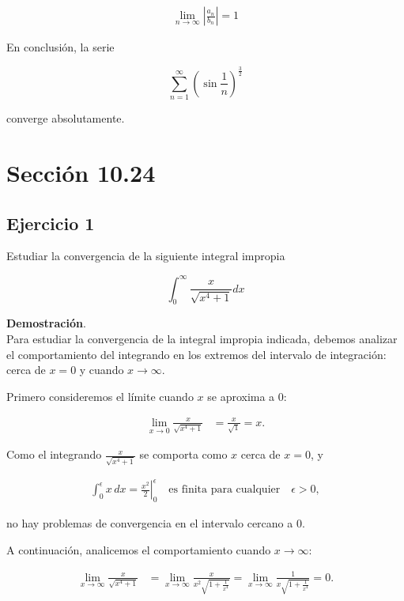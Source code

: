\documentclass{article}
\begin{document}
    \begin{align*}
    \lim _{n \rightarrow \infty}\left|\frac{a_n}{b_n}\right| = 1
    \end{align*}

    En conclusión, la serie

    $$
    \sum_{n=1}^{\infty}\left(\sin \frac{1}{n}\right)^{\frac{3}{2}}
    $$

    converge absolutamente.
    \section*{Sección 10.24}
    \subsection*{Ejercicio 1}

    Estudiar la convergencia de la siguiente integral impropia

    $$
    \int_{0}^{\infty} \frac{x}{\sqrt{x^{4}+1}} d x
    $$

    \textbf{Demostración}.\\

    Para estudiar la convergencia de la integral impropia indicada, debemos analizar el comportamiento del integrando en los extremos del intervalo de integración: cerca de $x = 0$ y cuando $x \to \infty$.

    Primero consideremos el límite cuando $x$ se aproxima a $0$:

    \begin{align*}
    \lim_{x \to 0} \frac{x}{\sqrt{x^4 + 1}}
    &= \frac{x}{\sqrt{1}} = x.
    \end{align*}

    Como el integrando $\frac{x}{\sqrt{x^4 + 1}}$ se comporta como $x$ cerca de $x=0$, y

    \begin{align*}
    \int_0^\epsilon x \, dx = \left. \frac{x^2}{2} \right|_0^\epsilon \quad \text{es finita para cualquier} \quad \epsilon > 0,
    \end{align*}

    no hay problemas de convergencia en el intervalo cercano a $0$.

    A continuación, analicemos el comportamiento cuando $x \to \infty$:

    \begin{align*}
    \lim_{x \to \infty} \frac{x}{\sqrt{x^4 + 1}}
    &= \lim_{x \to \infty} \frac{x}{x^2 \sqrt{1 + \frac{1}{x^4}}}
    = \lim_{x \to \infty} \frac{1}{x \sqrt{1 + \frac{1}{x^4}}} = 0.
    \end{align*}
\end{document}
